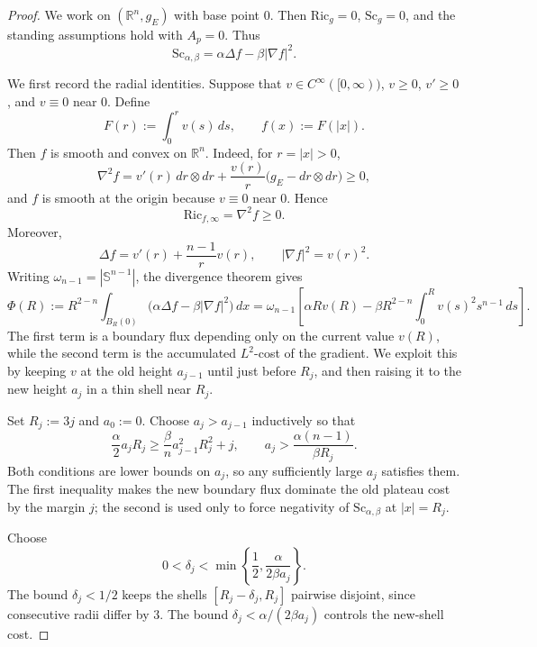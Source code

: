 \documentclass[12pt,oneside,a4paper]{article}
\theoremstyle{mytheorem}
\theoremstyle{remark}
\begin{document}
\begin{proof}
We work on \((\mathbb R^n,g_{E})\) with base point \(0\). Then
\(\mathrm{Ric}_g=0\), \(\mathrm{Sc}_g=0\), and the standing assumptions hold
with \(A_p=0\). Thus
\[
  \mathrm{Sc}_{\alpha,\beta}
  =
  \alpha\Delta f-\beta|\nabla f|^2 .
\]

We first record the radial identities. Suppose that
\(v\in C^\infty([0,\infty))\), \(v\ge0\), \(v'\ge0\), and \(v\equiv0\) near
\(0\). Define
\[
  F(r):=\int_0^r v(s)\,ds,
  \qquad
  f(x):=F(|x|).
\]
Then \(f\) is smooth and convex on \(\mathbb R^n\). Indeed, for \(r=|x|>0\),
\[
  \nabla^2 f
  =
  v'(r)\,dr\otimes dr
  +
  \frac{v(r)}{r}
  \bigl(g_{E}-dr\otimes dr\bigr)\ge0,
\]
and \(f\) is smooth at the origin because \(v\equiv0\) near \(0\). Hence
\[
  \mathrm{Ric}_{f,\infty}
  =
  \nabla^2 f
  \ge0.
\]
Moreover,
\[
  \Delta f=v'(r)+\frac{n-1}{r}v(r),
  \qquad
  |\nabla f|^2=v(r)^2 .
\]
Writing \(\omega_{n-1}=|\mathbb S^{n-1}|\), the divergence theorem gives
\begin{equation}\label{eq:Phi-short-final}
  \Phi(R):=
  R^{2-n}
  \int_{B_R(0)}
  \bigl(\alpha\Delta f-\beta|\nabla f|^2\bigr)\,dx
  =
  \omega_{n-1}
  \left[
    \alpha Rv(R)
    -
    \beta R^{2-n}\int_0^R v(s)^2s^{n-1}\,ds
  \right].
\end{equation}
The first term is a boundary flux depending only on the current value
\(v(R)\), while the second term is the accumulated \(L^2\)-cost of the
gradient. We exploit this by keeping \(v\) at the old height \(a_{j-1}\) until
just before \(R_j\), and then raising it to the new height \(a_j\) in a thin
shell near \(R_j\).

Set \(R_j:=3j\) and \(a_0:=0\). Choose \(a_j>a_{j-1}\) inductively so that
\begin{equation}\label{eq:aj-final-short}
  \frac{\alpha}{2}a_jR_j
  \ge
  \frac{\beta}{n}a_{j-1}^2R_j^2+j,
  \qquad
  a_j>\frac{\alpha(n-1)}{\beta R_j}.
\end{equation}
Both conditions are lower bounds on \(a_j\), so any sufficiently large \(a_j\)
satisfies them. The first inequality makes the new boundary flux dominate the
old plateau cost by the margin \(j\); the second is used only to force
negativity of \(\mathrm{Sc}_{\alpha,\beta}\) at \(|x|=R_j\).

Choose
\[
  0<\delta_j<
  \min\left\{\frac12,\frac{\alpha}{2\beta a_j}\right\}.
\]
The bound \(\delta_j<1/2\) keeps the shells
\([R_j-\delta_j,R_j]\) pairwise disjoint, since consecutive radii differ by
\(3\). The bound \(\delta_j<\alpha/(2\beta a_j)\) controls the new-shell cost.


\end{proof}
\end{document}
